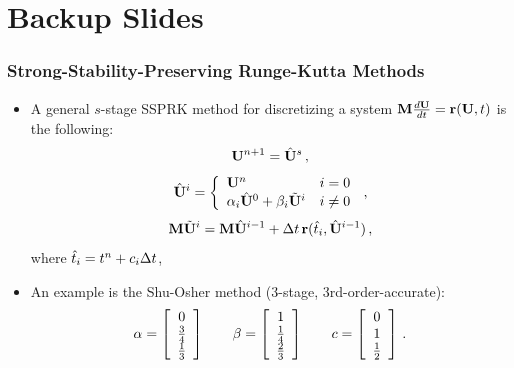 \section{Backup Slides}
\begin{frame}
\frametitle{Strong-Stability-Preserving Runge-Kutta Methods}

\begin{itemize}
  \item A general $s$-stage SSPRK method for discretizing a system
    $\mathbf{M}\frac{d\mathbf{U}}{dt} = \mathbf{r}(\mathbf{U},t)$
    is the following:
    \begin{equation}
      \mathbf{U}^{n+1} = \hat{\mathbf{U}}^{s} \,,
    \end{equation}
    \begin{equation}
      \hat{\mathbf{U}}^i = \left\{\begin{array}{l l}
        \mathbf{U}^n & i = 0\\
        \alpha_i\hat{\mathbf{U}}^0
        + \beta_i\tilde{\mathbf{U}}^i & i\ne 0
      \end{array}\right. \,, 
    \end{equation}
    \begin{equation}
      \mathbf{M}\tilde{\mathbf{U}}^i = \mathbf{M}\hat{\mathbf{U}}^{i-1}
        + \Delta t\,\mathbf{r}(\hat{t}_i,\hat{\mathbf{U}}^{i-1})
      \,,
    \end{equation}
    where $\hat{t}_i = t^n+c_i\Delta t$,
  \item An example is the Shu-Osher method (3-stage, 3rd-order-accurate):
    \begin{equation}
      \alpha = \left[\begin{array}{c}
        0\\\frac{3}{4}\\\frac{1}{3}\end{array}\right]
        \qquad\beta = \left[\begin{array}{c}
        1\\\frac{1}{4}\\\frac{2}{3}\end{array}\right]
        \qquad c = \left[\begin{array}{c}0\\1\\\frac{1}{2}\end{array}\right] \,.
    \end{equation}
\end{itemize}

\end{frame}
